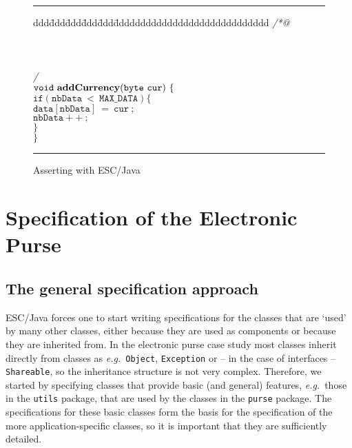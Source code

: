 \documentclass[a4paper]{llncs}
\begin{document}
\begin{figure}[hbt]
\rule{\linewidth}{0.3mm}
\begin{tabbing}
ddd\=ddd\=ddd\=ddd\=ddd\=ddddddddddddddddddddddddddddd \kill
{\it /*@ } \\
 \\
 \\
 \\
{\it */ } \\
$\mathtt{void\ {\bf addCurrency}(byte\ cur)\ \{}$ \\
\>$\mathtt{if(nbData\ <\ MAX\_DATA) \{}$ \\
\>\>$\mathtt{data[nbData]\ =\ cur\ ;}$ \\
\>\>$\mathtt{nbData++\ ;}$ \\
\>$\mathtt{\}}$ \\
$\mathtt{\}}$ 
\end{tabbing}
\caption{Asserting with ESC/Java}
\label{fig-add-cur}
\rule{\linewidth}{0.3mm}
\end{figure}






\section{Specification of the Electronic Purse}
\label{SectSpecPurse}


\subsection{The general specification approach}
ESC/Java forces one to start writing specifications for the classes
that are `used' by many other classes, either because they are used as 
components or because they are inherited from. In the electronic purse 
case study most classes inherit directly from classes as
\emph{e.g.}~\texttt{Object}, \texttt{Exception} or -- in the case of
interfaces -- \texttt{Shareable}, so the inheritance structure is not
very complex. Therefore, we started by specifying classes that
provide basic (and general) features, \emph{e.g.}~those in the
\texttt{utils} package,
that are used by the classes in the \texttt{purse} package. The
specifications for these basic classes form the basis for the
specification of the more application-specific classes, so it is
important that they are sufficiently detailed.
\end{document}

